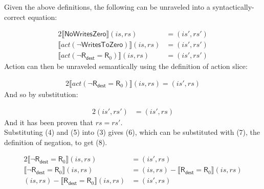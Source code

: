 \documentclass[12pt, letterpaper]{article}
\newcommand\interp[1]{\llbracket #1 \rrbracket}
\begin{document}
     Given the above definitions, the following can be unraveled into a syntactically-correct equation:
 \par\nobreak
 {\fontsize{10pt}{12pt}\selectfont
 \begin{alignat}{2}
     \interp{ \mathsf{NoWritesZero} } (\mathit{is}, \mathit{rs}) 
     &=
     (\mathit{is}', \mathit{rs}')
     \\
     \interp{ act(\neg \mathsf{WritesToZero}) } (\mathit{is}, \mathit{rs}) 
     &=
     (\mathit{is}', \mathit{rs}')
     \\
     \interp{ act(\neg \mathsf{R}_{\mathsf{dest}} = \mathsf{R}_0) } (\mathit{is}, \mathit{rs}) 
     &=
     (\mathit{is}', \mathit{rs}')
 \end{alignat}
 }%
     Action can then be unraveled semantically using the definition of action slice:
 \par\nobreak
 {\fontsize{10pt}{12pt}\selectfont
 \begin{alignat}{2}
     \interp{ act(\neg \mathsf{R}_{\mathsf{dest}} = \mathsf{R}_0) } (\mathit{is}, \mathit{rs}) 
     =
     (\mathit{is}', \mathit{rs})
 \end{alignat}
 }%
     And so by substitution:
 \par\nobreak
 {\fontsize{10pt}{12pt}\selectfont
 \begin{alignat}{2}
     (\mathit{is}', \mathit{rs}')
     &=
     (\mathit{is}', \mathit{rs})
 \end{alignat}
 }%
     And it has been proven that $\mathit{rs} = \mathit{rs'}$.\\
     Substituting (4) and (5) into (3) gives (6), which can be substituted with (7), the definition of negation, to get (8). 
 \par\nobreak
 {\fontsize{10pt}{12pt}\selectfont
 \begin{alignat}{2}
     \interp{ \neg \mathsf{R}_{\mathsf{dest}} = \mathsf{R}_0 } (\mathit{is}, \mathit{rs}) 
     &=
     (\mathit{is}', \mathit{rs})\\
     \interp{ \neg \mathsf{R}_{\mathsf{dest}} = \mathsf{R}_0 } (\mathit{is}, \mathit{rs}) 
     &=
     (\mathit{is}, \mathit{rs}) - \interp{ \mathsf{R}_{\mathsf{dest}} = \mathsf{R}_0 } (\mathit{is}, \mathit{rs})\\ %
     (\mathit{is}, \mathit{rs}) - \interp{ \mathsf{R}_{\mathsf{dest}} = \mathsf{R}_0 } (\mathit{is}, \mathit{rs}) 
     &=
     (\mathit{is}', \mathit{rs})
 \end{alignat}
 }%
\end{document}
